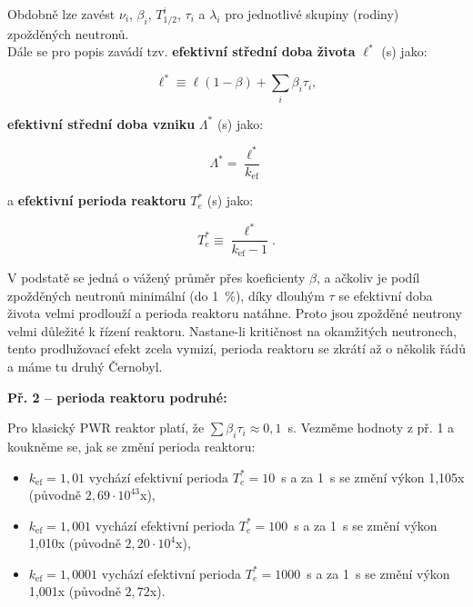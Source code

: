 Obdobně lze zavést $\nu_i$, $\beta_i$, $T_{1/2}^i$, $\tau_i$ a $\lambda_i$ pro jednotlivé skupiny (rodiny) zpožděných neutronů.\\

Dále se pro popis zavádí tzv. \textbf{efektivní střední doba života} $\ell^*$ (s) jako:

\begin{equation}
  \boxed{
  \ell^* \equiv \ell(1-\beta) + \sum_i \beta_i \tau_i,
  \label{efektivni_stredni_doba_zivota}}
\end{equation}

\textbf{efektivní střední doba vzniku} $\Lambda^*$ (s) jako:

\begin{equation}
  \boxed{
  \Lambda^* = \dfrac{\ell^*}{k_{\text{ef}}}
  \label{efektivni_stredni_doba_vzniku}}
\end{equation}

a \textbf{efektivní perioda reaktoru} $T_e^*$ (s) jako:

\begin{equation}
  \boxed{
  T_e^* \equiv \dfrac{\ell^*}{k_{\text{ef}} - 1}.
  \label{efektivni_perioda}}
\end{equation}

V podstatě se jedná o vážený průměr přes koeficienty $\beta$, a ačkoliv je podíl zpožděných neutronů minimální (do 1~\%), díky dlouhým $\tau$ se efektivní doba života velmi prodlouží a perioda reaktoru natáhne. Proto jsou zpožděné neutrony velmi důležité k řízení reaktoru. Nastane-li kritičnost na okamžitých neutronech, tento prodlužovací efekt zcela vymizí, perioda reaktoru se zkrátí až o několik řádů a máme tu druhý Černobyl.\\

\small

\textbf{Př. 2 -- perioda reaktoru podruhé:}

Pro klasický PWR reaktor platí, že $\sum \beta_i \tau_i \approx 0,1$~s. Vezměme hodnoty z př. 1 a koukněme se, jak se změní perioda reaktoru:

\begin{itemize}
  \item $k_{\text{ef}} = 1,01$ vychází efektivní perioda $T_e^* = 10$~s a za 1~s se změní výkon 1,105x (původně $2,69 \cdot 10^{43}$x),
  \item $k_{\text{ef}} = 1,001$ vychází efektivní perioda $T_e^* = 100$~s a za 1~s se změní výkon 1,010x (původně $2,20 \cdot 10^{4}$x),
  \item $k_{\text{ef}} = 1,0001$ vychází efektivní perioda $T_e^* = 1000$~s a za 1~s se změní výkon 1,001x (původně $2,72$x).
\end{itemize}

